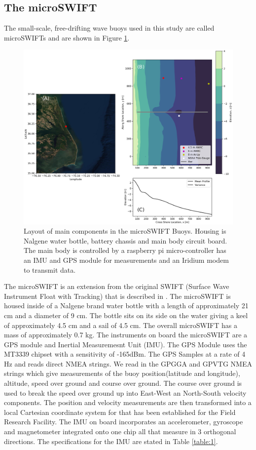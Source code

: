 \documentclass[essd, manuscript]{copernicus}
\begin{document}
\subsection{The microSWIFT}
The small-scale, free-drifting wave buoys used in this study are called microSWIFTs and are shown in Figure \ref{fig:1}. 
\begin{figure}
    \centering
    \includegraphics[width=\textwidth,height=\textheight,keepaspectratio]{Figures/fig01.png}
    \caption{Layout of main components in the microSWIFT Buoys. Housing is Nalgene water bottle, battery chassis and main body circuit board. The main body is controlled by a raspberry pi micro-controller has an IMU and GPS module for measurements and an Iridium modem to transmit data. }
    \label{fig:1}
\end{figure}

The microSWIFT is an extension from the original SWIFT (Surface Wave Instrument Float with Tracking) that is described in \citeauthor{thomson_wave_2012} \citeyear{thomson_wave_2012}. The microSWIFT is housed inside of a Nalgene brand water bottle with a length of approximately 21 cm and a diameter of 9 cm. The bottle sits on its side on the water giving a keel of approximately 4.5 cm and a sail of 4.5 cm. The overall microSWIFT has a mass of approximately 0.7 kg. The instruments on board the microSWIFT are a GPS module and Inertial Measuremesnt Unit (IMU). The GPS Module uses the MT3339 chipset with a sensitivity of -165dBm. The GPS Samples at a rate of 4 Hz and reads direct NMEA strings. We read in the GPGGA and GPVTG NMEA strings which give measurements of the buoy position(latitude and longitude), altitude, speed over ground and course over ground. The course over ground is used to break the speed over ground up into East-West an North-South velocity components. The position and velocity measurements are then transformed into a local Cartesian coordinate system for that has been established for the Field Research Facility. The IMU on board incorporates an accelerometer, gyroscope and magnetometer integrated onto one chip all that measure in 3 orthogonal directions. The specifications for the IMU are stated in Table \ref{table:1}.
\end{document}
